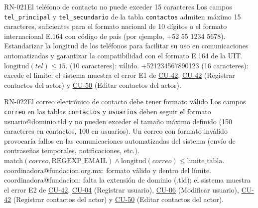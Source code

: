 \begin{BussinesRule}[%
	\brClassification{\btDerivation}{\bcIntegrity}{\blStrict}%
	]{RN-021}{El teléfono de contacto no puede exceder 15 caracteres}
	\BRitem[Descripción:] Los campos \texttt{tel\_principal} y \texttt{tel\_secundario} de la tabla \texttt{contactos} admiten máximo 15 caracteres, suficientes para el formato nacional de 10 dígitos o el formato internacional E.164 con código de país (por ejemplo, +52 55 1234 5678).
	\BRitem[Motivación:] Estandarizar la longitud de los teléfonos para facilitar su uso en comunicaciones automatizadas y garantizar la compatibilidad con el formato E.164 de la UIT.
	\BRitem[Sentencia:] $\text{longitud}(tel) \le 15$.
	 (10 caracteres): válido.
	 +521234567890123 (16 caracteres): excede el límite; el sistema muestra el error E1 de \hyperlink{CU-42}{CU-42}.
	 \hyperlink{CU-42}{CU-42} (Registrar contactos del actor) y \hyperlink{CU-50}{CU-50} (Editar contactos del actor).
\end{BussinesRule}

\begin{BussinesRule}[%
	\brClassification{\btDerivation}{\bcIntegrity}{\blStrict}%
	]{RN-022}{El correo electrónico de contacto debe tener formato válido}
	\BRitem[Descripción:] Los campos \texttt{correo} en las tablas \texttt{contactos} y \texttt{usuarios} deben seguir el formato usuario@dominio.tld y no pueden exceder el tamaño máximo definido (150 caracteres en contactos, 100 en usuarios).
	\BRitem[Motivación:] Un correo con formato inválido provocaría fallos en las comunicaciones automatizadas del sistema (envío de contraseñas temporales, notificaciones, etc.).
	\BRitem[Sentencia:] $\text{match}(correo, \text{REGEXP\_EMAIL}) \land \text{longitud}(correo) \le \text{limite\_tabla}$.
	 coordinadora@fundacion.org.mx: formato válido y dentro del límite.
	 coordinadora@fundacion: falta la extensión de dominio (.tld); el sistema muestra el error E2 de \hyperlink{CU-42}{CU-42}.
	 \hyperlink{CU-04}{CU-04} (Registrar usuario), \hyperlink{CU-06}{CU-06} (Modificar usuario), \hyperlink{CU-42}{CU-42} (Registrar contactos del actor) y \hyperlink{CU-50}{CU-50} (Editar contactos del actor).
\end{BussinesRule}

